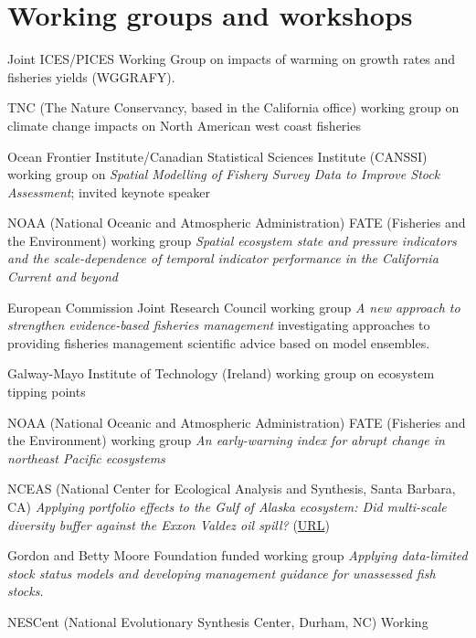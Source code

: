 \hypertarget{working-groups-and-workshops}{%
\section{Working groups and
workshops}\label{working-groups-and-workshops}}

\begin{description}
\tightlist
\item[2020--23]
Joint ICES/PICES Working Group on impacts of warming on growth rates and
fisheries yields (WGGRAFY).
\item[2020--22]
TNC (The Nature Conservancy, based in the California office) working
group on climate change impacts on North American west coast fisheries
\item[2020]
Ocean Frontier Institute/Canadian Statistical Sciences Institute
(CANSSI) working group on \emph{Spatial Modelling of Fishery Survey Data
to Improve Stock Assessment}; invited keynote speaker
\item[2019--20]
NOAA (National Oceanic and Atmospheric Administration) FATE (Fisheries
and the Environment) working group \emph{Spatial ecosystem state and
pressure indicators and the scale-dependence of temporal indicator
performance in the California Current and beyond}
\item[2018--19]
European Commission Joint Research Council working group \emph{A new
approach to strengthen evidence-based fisheries management}
investigating approaches to providing fisheries management scientific
advice based on model ensembles.
\item[2018]
Galway-Mayo Institute of Technology (Ireland) working group on ecosystem
tipping points
\item[2016--17]
NOAA (National Oceanic and Atmospheric Administration) FATE (Fisheries
and the Environment) working group \emph{An early-warning index for
abrupt change in northeast Pacific ecosystems}
\item[2015--16]
NCEAS (National Center for Ecological Analysis and Synthesis, Santa
Barbara, CA) \emph{Applying portfolio effects to the Gulf of Alaska
ecosystem: Did multi-scale diversity buffer against the Exxon Valdez oil
spill?} (\href{https://www.nceas.ucsb.edu/featured/marshall}{URL})
\item[2015--16]
Gordon and Betty Moore Foundation funded working group \emph{Applying
data-limited stock status models and developing management guidance for
unassessed fish stocks}.
\item[2011--13]
NESCent (National Evolutionary Synthesis Center, Durham, NC) Working

\end{description}
